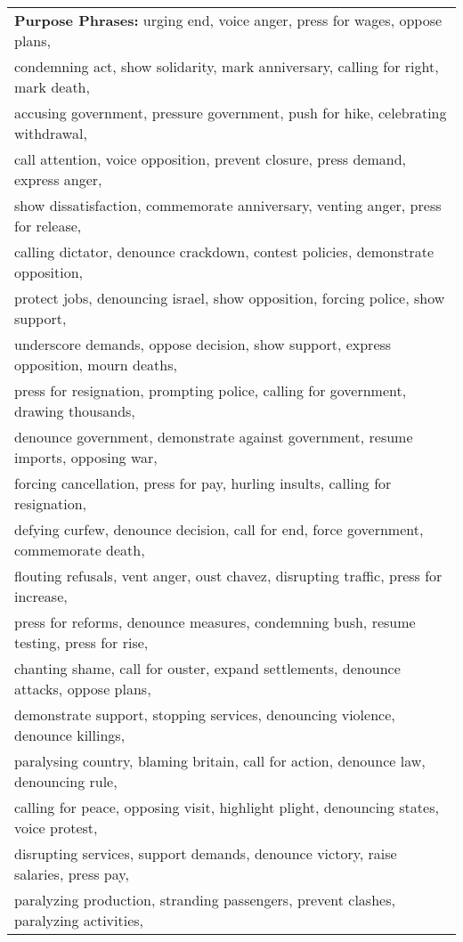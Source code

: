\begin{table}[htbp]
\small
\centering
\begin{tabular}[center]{|l|} \hline
{\bf Purpose Phrases:} urging end, voice anger, press for wages, oppose plans, \\
condemning act, show solidarity, mark anniversary, calling for right, mark death,\\
accusing government, pressure government, push for hike, celebrating withdrawal, \\ 
call attention, voice opposition, prevent closure, press demand, express anger, \\
show dissatisfaction, commemorate anniversary, venting anger, press for release, \\
calling dictator, denounce crackdown, contest policies, demonstrate opposition, \\
protect jobs, denouncing israel, show opposition, forcing police, show support, \\
underscore demands, oppose decision, show support, express opposition, mourn deaths, \\
press for resignation, prompting police, calling for government, drawing thousands, \\
denounce government, demonstrate against government, resume imports, opposing war, \\
forcing cancellation, press for pay, hurling insults, calling for resignation, \\
defying curfew, denounce decision, call for end, force government, commemorate death, \\
flouting refusals, vent anger, oust chavez, disrupting traffic, press for increase, \\
press for reforms, denounce measures, condemning bush, resume testing, press for rise, \\
chanting shame, call for ouster, expand settlements, denounce attacks, oppose plans, \\
demonstrate support, stopping services, denouncing violence, denounce killings, \\
paralysing country, blaming britain, call for action, denounce law, denouncing rule, \\
calling for peace, opposing visit, highlight plight, denouncing states, voice protest, \\
disrupting services, support demands, denounce victory, raise salaries, press pay, \\
paralyzing production, stranding passengers, prevent clashes, paralyzing activities, \\

\end{tabular}
\end{table}
